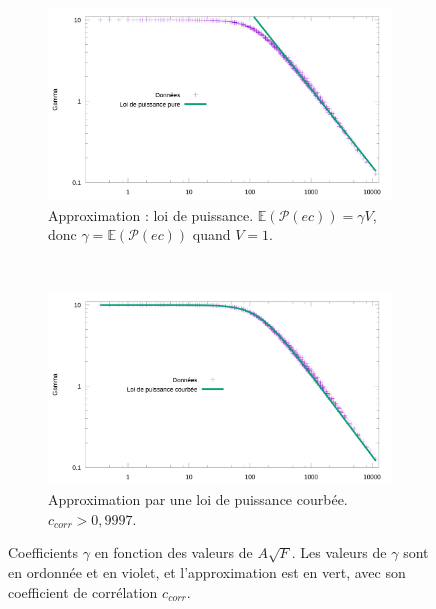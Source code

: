 	\begin{figure}[!htb]
		\begin{subfigure}[t]{0.485\textwidth}
			\centering
			\includegraphics[width=\textwidth]{figures/ch4/asqrtFVgammaLogLogUnbrokenPowerFit}
			\caption{Approximation : loi de puissance. $\mathbb{E}(\mathcal{P}(ec)) = \gamma{}V$, donc $\gamma = \mathbb{E}(\mathcal{P}(ec))$ quand $V = 1$.}
			\label{fig:asqrtFVgammaLogLogUnbrokenPowerFit}
		\end{subfigure}
		~
		\begin{subfigure}[t]{0.485\textwidth}
			\centering
			\includegraphics[width=\textwidth]{figures/ch4/asqrtFVgammaLogLogPowerFit}
			\caption{Approximation par une loi de puissance courbée. $c_{corr} > 0,9997$.}
			\label{fig:asqrtFVgammaLogLogPowerFit}
		\end{subfigure}
		\caption[Coefficients $\gamma$ en fonction des valeurs de $A\sqrt{F}$]{Coefficients $\gamma$ en fonction des valeurs de $A\sqrt{F}$. Les valeurs de $\gamma$ sont en ordonnée et en violet, et l'approximation est en vert, avec son coefficient de corrélation $c_{corr}$.}
		\label{fig:asqrtFVgammaLogLogFits}
	\end{figure}
	
